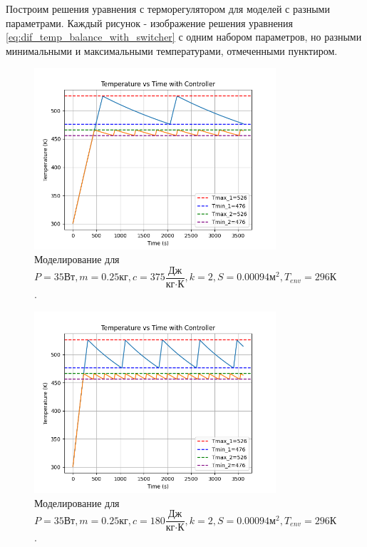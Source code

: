 Построим решения уравнения с терморегулятором для моделей с разными параметрами.
Каждый рисунок - изображение решения уравнения \ref{eq:dif_temp_balance_with_switcher} с одним набором параметров, но разными минимальными и максимальными температурами, отмеченными пунктиром.
\begin{figure}[h]  %
	\centering
	\includegraphics[width=0.8\textwidth]{imgs/heater_w._controll_3.png}  %
	\caption{Моделирование для 
		\[
		P=35\text{Вт}, m = 0.25\text{кг}, c=375\frac{\text{Дж}}{\text{кг}\cdot\text{К}},k = 2, S = 0.00094 \text{м}^2,T_{env}= 296 \text{К}
		\].}  %
	\label{fig:heater_with_controll_3}  
\end{figure}
\newpage
\begin{figure}[h]  %
	\centering
	\includegraphics[width=0.8\textwidth]{imgs/heater_w._controll_2.png}  %
	\caption{Моделирование для 
		\[
		P=35\text{Вт}, m = 0.25\text{кг}, c=180\frac{\text{Дж}}{\text{кг}\cdot\text{К}},k = 2, S = 0.00094 \text{м}^2,T_{env}= 296 \text{К}
		\].}  %
	\label{fig:heater_with_controll_2}  
\end{figure} 

